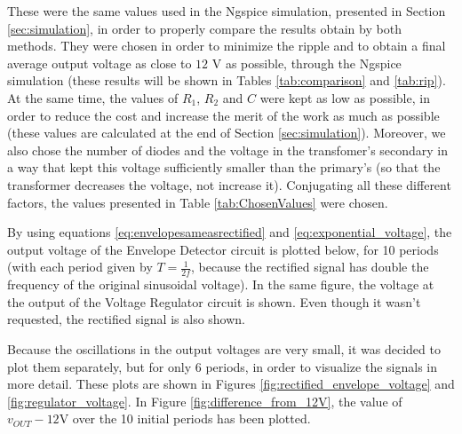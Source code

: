  These were the same values used in the Ngspice simulation, presented in Section \ref{sec:simulation}, in order to properly compare the results obtain by both methods. They were chosen in order to minimize the ripple and to obtain a final average output voltage as close to $12$ V as possible, through the Ngspice simulation (these results will be shown in Tables \ref{tab:comparison} and \ref{tab:rip}). At the same time, the values of $R_1$, $R_2$ and $C$ were kept as low as possible, in order to reduce the cost and increase the merit of the work as much as possible (these values are calculated at the end of Section \ref{sec:simulation}). Moreover, we also chose the number of diodes and the voltage in the transfomer's secondary in a way that kept this voltage sufficiently smaller than the primary's (so that the transformer decreases the voltage, not increase it). Conjugating all these different factors, the values presented in Table \ref{tab:ChosenValues} were chosen.
\par
By using equations \ref{eq:envelopesameasrectified} and \ref{eq:exponential_voltage}, the output voltage of the Envelope Detector circuit is plotted below, for 10 periods (with each period given by $T=\frac{1}{2f}$, because the rectified signal has double the frequency of the original sinusoidal voltage). In the same figure, the voltage at the output of the Voltage Regulator circuit is shown. Even though it wasn't requested, the rectified signal is also shown.


Because the oscillations in the output voltages are very small, it was decided to plot them separately, but for only 6 periods, in order to visualize the signals in more detail. These plots are shown in Figures \ref{fig:rectified_envelope_voltage} and \ref{fig:regulator_voltage}. In Figure \ref{fig:difference_from_12V}, the value of $v_{OUT}-12$V over the 10 initial periods has been plotted.
